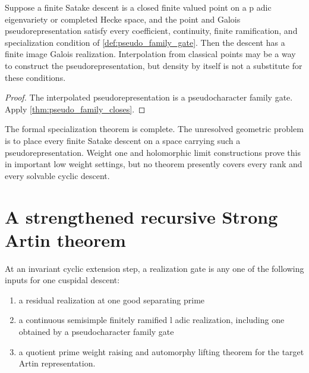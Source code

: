 \begin{corollary}\label{cor:eigenvariety_interpolation}
Suppose a finite Satake descent is a closed finite valued point on a p adic eigenvariety or completed Hecke space, and the point and Galois pseudorepresentation satisfy every coefficient, continuity, finite ramification, and specialization condition of \cref{def:pseudo_family_gate}. Then the descent has a finite image Galois realization. Interpolation from classical points may be a way to construct the pseudorepresentation, but density by itself is not a substitute for these conditions.
\end{corollary}

\begin{proof}
The interpolated pseudorepresentation is a pseudocharacter family gate. Apply \cref{thm:pseudo_family_closes}.
\end{proof}

\begin{remark}\label{rem:eigenvariety_boundary}
The formal specialization theorem is complete. The unresolved geometric problem is to place every finite Satake descent on a space carrying such a pseudorepresentation. Weight one and holomorphic limit constructions prove this in important low weight settings, but no theorem presently covers every rank and every solvable cyclic descent.
\end{remark}

\section{A strengthened recursive Strong Artin theorem}\label{sec:strengthened_recursion}

\begin{definition}\label{def:realization_gate_step}
At an invariant cyclic extension step, a realization gate is any one of the following inputs for one cuspidal descent:

\begin{enumerate}
\item a residual realization at one good separating prime
\item a continuous semisimple finitely ramified l adic realization, including one obtained by a pseudocharacter family gate
\item a quotient prime weight raising and automorphy lifting theorem for the target Artin representation.
\end{enumerate}
\end{definition}

